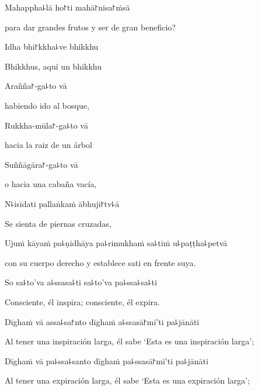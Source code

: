 Mahappha꜕lā ho꜓ti mahā꜓nisa꜓ṁsā

\begin{english}
  para dar grandes frutos y ser de gran beneficio?
\end{english}

Idha bhi꜓kkha꜕ve bhikkhu

\begin{english}
  Bhikkhus, aquí un bhikkhu
\end{english}

Arañña꜓-ga꜕to vā

\begin{english}
  habiendo ido al bosque,
\end{english}

Rukkha-mūla꜓-ga꜕to vā

\begin{english}
  hacia la raiz de un árbol
\end{english}

Suññāgāra꜓-ga꜕to vā

\begin{english}
  o hacia una cabaña vacía,
\end{english}

N꜕isīdati pallaṅkaṁ ābhuji꜓tv꜕ā

\begin{english}
  Se sienta de piernas cruzadas,
\end{english}

Ujuṁ kāyaṁ pa꜕ṇidhāya pa꜕rimukhaṁ sa꜕tiṁ u꜕paṭṭha꜕petvā

\begin{english}
  con su cuerpo derecho y establece sati en frente suya.
\end{english}

So sa꜕to'va a꜕ssasa꜕ti sa꜕to'va pa꜕ssa꜕sa꜕ti

\begin{english}
  Consciente, él inspira; consciente, él expira.
\end{english}

Dīghaṁ vā assa꜕sa꜓nto dīghaṁ a꜕ssasā꜓mī'ti pa꜕jānāti

\begin{english}
  Al tener una inspiración larga, él sabe `Esta es una inspiración larga';
\end{english}

Dīghaṁ vā pa꜕ssa꜕santo dīghaṁ pa꜕ssasā꜓mī'ti pa꜕jānāti

\begin{english}
  Al tener una expiración larga, él sabe `Esta es una expiración larga';
\end{english}

